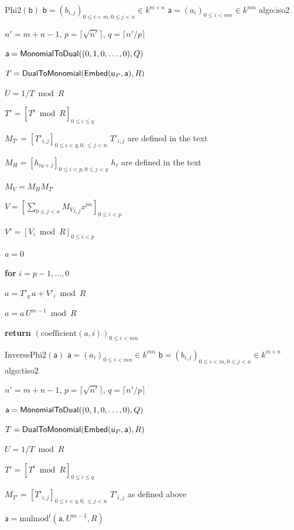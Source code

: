 \documentclass{sig-alternate}
\def\va {\ensuremath{\mathsf{a}}}
\def\vy {\ensuremath{\mathsf{a}}}
\def\vu {\ensuremath{\mathsf{u}}}
\def\vb {\ensuremath{\mathsf{b}}}
\def\coeff {\ensuremath{\mathrm{coefficient}}}
\def\mulmod {\ensuremath{\mathrm{mulmod}}}
\newcounter{algo}
\newenvironment{algorithm_noendline}[4]{\small\begin{center}\begin{minipage}{0.48\textwidth}
      \refstepcounter{algo}
      \label{#4}
      \sf
      \rule{\textwidth}{0.2pt}\\
      \makebox[\textwidth][c]{Algorithm~\arabic{algo}:~\textbf{#1}}\\
      \rule[0.5\baselineskip]{\textwidth}{0.2pt}\\

      \vspace{-12pt}

      \parbox{\textwidth}{\textbf{Input} #2}
      \parbox{\textwidth}{\textbf{Output} #3}

\vspace{-7pt}

      \begin{enumerate*}}{\end{enumerate*}
      \vspace{-11pt}
\end{minipage}\end{center}
}
\newenvironment{algorithm_endline}[4]{\small\begin{center}\begin{minipage}{0.48\textwidth}
      \refstepcounter{algo}
      \label{#4}
      \sf
      \rule{\textwidth}{0.2pt}\\
      \makebox[\textwidth][c]{Algorithm~\arabic{algo}:~\textbf{#1}}\\
      \rule[0.5\baselineskip]{\textwidth}{0.2pt}\\

      \vspace{-12pt}

      \parbox{\textwidth}{\textbf{Input} #2}
      \parbox{\textwidth}{\textbf{Output} #3}

\vspace{-7pt}

      \begin{enumerate*}}{\end{enumerate*}
      \vspace{-11pt}
      \rule{\textwidth}{0.2pt}
\end{minipage}\end{center}
}
\begin{document}
\begin{algofloat}[t]
  \begin{algorithm_noendline}
{Phi2$(\vb)$}      
{$\vb = (b_{i,j})_{0 \le i < m, 0 \le j < n} \in k^{m \times n}$}
{$\va = (a_{i})_{0 \le i < mn} \in k^{m n}$}
{algo:iso2}
\item $n'=m+n-1$, $p=\lceil \sqrt {n'} \rceil$, $q=\lceil n'/p\rceil$
\item $\vy={\sf MonomialToDual}((0,1,0,\dots,0),Q)$ 
\item \label{iso2:2} $T={\sf DualToMonomial}({\sf Embed}(\vu_P, \vy), R)$
\item \label{iso2:3} $U=1/T \bmod R$
\item \label{iso2:4} $T'=[T^i \bmod R]_{0 \le i \le q}$
\item $M_{T'}=[T'_{i,j}]_{0\le i < q, 0, \le j < n}$ \hfill $T'_{i,j}$ are defined in the text
\item $M_H=[h_{iq+j}]_{0 \le i <p, 0 \le j < q}$ \hfill $h_\ell$ are defined in the text
\item \label{iso2:7} $M_V = M_H M_{T'}$
\item $V=[\sum_{0 \le j <n} {M_V}_{i,j} z^{jm} ]_{0 \le i <p}$
\item $V'=[V_i \bmod R]_{0 \le i <p}$
\item $a=0$
\item {\bf for} {$i=p-1,\dots,0$}\label{iso2:11}
\item \hspace{7mm} $a=T'_q\, a+V'_i \bmod R$
\item \label{iso2:14} $a=a\, U^{m-1} \bmod R$
\item {\bf return} $(\coeff(a,i))_{0 \le i < mn}$
  \end{algorithm_noendline}
  \begin{algorithm_endline}
{InversePhi2$(\va)$}
{$\va = (a_{i})_{0 \le i < mn} \in k^{m n}$}
{$\vb = (b_{i,j})_{0 \le i < m, 0 \le j < n} \in k^{m \times n}$}
{algo:tiso2}
\item $n'=m+n-1$, $p=\lceil \sqrt {n'} \rceil$, $q=\lceil n'/p\rceil$
\item $\vy={\sf MonomialToDual}((0,1,0,\dots,0),Q)$ 
\item $T={\sf DualToMonomial}({\sf Embed}(\vu_P, \vy), R)$
\item $U=1/T \bmod R$
\item $T'=[T^i \bmod R]_{0 \le i \le q}$
\item $M_{T'}=[T'_{i,j}]_{0\le i < q, 0, \le j < n}$ \hfill $T'_{i,j}$ as defined above
\item $\va = \mulmod^t(\va, U^{m-1}, R)$

\end{algorithm_endline}
\end{algofloat}
\end{document}
